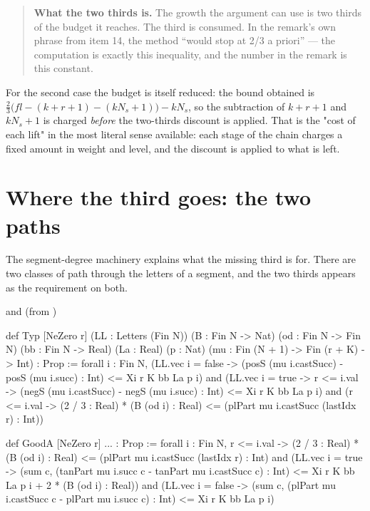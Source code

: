\begin{quote}
\textbf{What the two thirds is.} The growth the argument can use is two
thirds of the budget it reaches. The third is consumed. In the remark's own
phrase from item 14, the method ``would stop at 2/3 a priori'' --- the
computation is exactly this inequality, and the number in the remark is this
constant.
\end{quote}

For the second case the budget is itself reduced: the bound obtained is
$\tfrac23\bigl(fl - (k+r+1) - (kN_s+1)\bigr) - kN_s$, so the subtraction of
$k+r+1$ and $kN_s+1$ is charged \emph{before} the two-thirds discount is
applied. That is the "cost of each lift" in the most literal sense available:
each stage of the chain charges a fixed amount in weight and level, and the
discount is applied to what is left.

\section{Where the third goes: the two paths}The segment-degree machinery explains what the missing third is for. There are
two classes of path through the letters of a segment, and the two thirds
appears as the requirement on both.

\begin{seamnote}{ and  (from )}
{\footnotesize
\begin{leanquote}
def Typ [NeZero r] (LL : Letters (Fin N)) (B : Fin N -> Nat)
  (od : Fin N -> Fin N)
(bb : Fin N -> Real) (La : Real) (p : Nat) (mu : Fin (N + 1)
      -> Fin (r + K) -> Int) : Prop :=
  forall i : Fin N,
(LL.vec i = false -> (posS (mu i.castSucc) - posS (mu
      i.succ) : Int) <= Xi r K bb La p i) and
(LL.vec i = true -> r <= i.val -> (negS (mu i.castSucc) -
      negS (mu i.succ) : Int) <= Xi r K bb La p i) and
(r <= i.val -> (2 / 3 : Real) * (B (od i) : Real) <= (plPart
      mu i.castSucc (lastIdx r) : Int))

def GoodA [NeZero r] ... : Prop :=
  forall i : Fin N, r <= i.val ->
(2 / 3 : Real) * (B (od i) : Real) <= (plPart mu i.castSucc
      (lastIdx r) : Int) and
(LL.vec i = true -> (sum c, (tanPart mu i.succ c - tanPart
      mu i.castSucc c) : Int)
        <= Xi r K bb La p i + 2 * (B (od i) : Real)) and
(LL.vec i = false -> (sum c, (plPart mu i.castSucc c -
      plPart mu i.succ c) : Int)
        <= Xi r K bb La p i)
\end{leanquote}
}
\end{seamnote}

